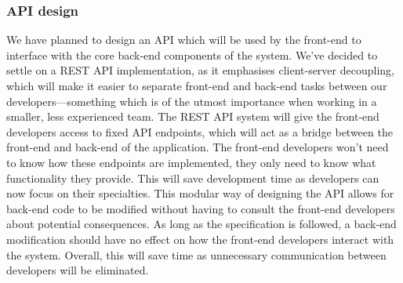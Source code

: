 \documentclass[10pt]{article}
\begin{document}
\subsubsection{API design}
We have planned to design an API which will be used by the front-end to
interface with the core back-end components of the system. We've decided to
settle on a REST API implementation, as it emphasises client-server decoupling,
which will make it easier to separate front-end and back-end tasks between our
developers—something which is of the utmost importance when working in a
smaller, less experienced team. The REST API system will give the front-end
developers access to fixed API endpoints, which will act as a bridge between the
front-end and back-end of the application. The front-end developers won't need
to know how these endpoints are implemented, they only need to know what
functionality they provide. This will save development time as developers can
now focus on their specialties. This modular way of designing the API allows for
back-end code to be modified without having to consult the front-end developers
about potential consequences. As long as the specification is followed, a
back-end modification should have no effect on how the front-end developers
interact with the system. Overall, this will save time as unnecessary
communication between developers will be eliminated.
\end{document}
